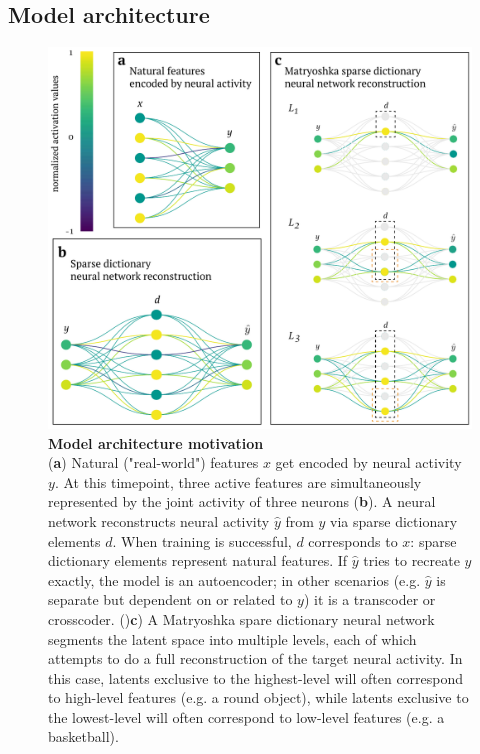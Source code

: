 \subsection{Model architecture}

\begin{figure}[t]
    \begin{minipage}{0.64\linewidth}
    \includegraphics[width=\linewidth]{figures/sdnn_arch.pdf}
    \end{minipage}%
    \begin{minipage}{0.35\linewidth}
    \caption{
        \small
        \textbf{Model architecture motivation} \\
        (\textbf{a}) Natural ("real-world") features $x$ get encoded by neural activity $y$. At this timepoint, three active features are simultaneously represented by the joint activity of three neurons (\textbf{b}). A neural network reconstructs neural activity $\hat{y}$ from $y$ via sparse dictionary elements $d$. When training is successful, $d$ corresponds to $x$: sparse dictionary elements represent natural features. If $\hat{y}$ tries to recreate $y$ exactly, the model is an autoencoder; in other scenarios (e.g. $\hat{y}$ is separate but dependent on or related to $y$) it is a transcoder or crosscoder. ()\textbf{c}) A Matryoshka spare dictionary neural network segments the latent space into multiple levels, each of which attempts to do a full reconstruction of the target neural activity. In this case, latents exclusive to the highest-level will often correspond to high-level features (e.g. a round object), while latents exclusive to the lowest-level will often correspond to low-level features (e.g. a basketball).
    }
    \label{fig:sdnn_arch}
    \end{minipage}
\end{figure}

